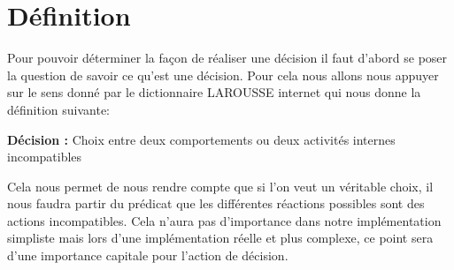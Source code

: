 \section{Définition}

Pour pouvoir déterminer la façon de réaliser une décision il faut d'abord se
poser la question de savoir ce qu'est une décision. Pour cela nous allons nous
appuyer sur le sens donné par le dictionnaire LAROUSSE internet qui nous donne
la définition suivante:

\begin{center}
  {\bfseries Décision :} Choix entre deux comportements ou deux activités
  internes incompatibles
\end{center}

Cela nous permet de nous rendre compte que si l'on veut un véritable choix, il
nous faudra partir du prédicat que les différentes réactions possibles sont des
actions incompatibles. Cela n'aura pas d'importance dans notre implémentation
simpliste mais lors d'une implémentation réelle et plus complexe, ce point sera
d'une importance capitale pour l'action de décision.

